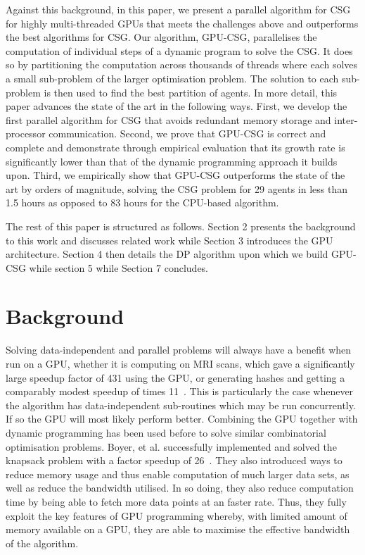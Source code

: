 \documentclass{llncs}
\begin{document}
Against this background, in this paper, we present a parallel algorithm for CSG for highly multi-threaded GPUs that meets the challenges above and outperforms the best algorithms for CSG. Our algorithm, GPU-CSG, parallelises the computation of individual steps of a dynamic program to solve the CSG. It does so by partitioning the computation across thousands of threads where each solves a small sub-problem of the larger optimisation problem. The solution to each sub-problem is then used to find the best partition of agents. In more detail, this paper advances the state of the art in the following ways. First, we develop the first parallel  algorithm for CSG that avoids redundant memory storage and inter-processor communication. Second, we prove that GPU-CSG is correct and complete and demonstrate through empirical evaluation that its growth rate is significantly lower than that of the dynamic programming approach it builds upon. Third, we empirically show that GPU-CSG outperforms the state of the art by orders of magnitude, solving the CSG problem for 29 agents in less than 1.5 hours as opposed to 83 hours for the CPU-based algorithm.

The rest of this paper is structured as follows. Section 2 presents the
background to this work and discusses related work while Section 3 introduces
the GPU architecture. Section 4 then details the DP algorithm upon which we build GPU-CSG
while section 5 while Section 7 concludes.

\section{Background}
Solving data-independent and parallel problems will always have a benefit when run on a GPU, 
whether it is computing on MRI scans, which gave a significantly large speedup factor of 431 using the GPU, or generating hashes and getting a comparably modest speedup of times 11~\cite{ryoo2008optimization}.  This is particularly the case whenever the algorithm has data-independent sub-routines which may be run concurrently. If so the GPU will most likely perform better. Combining the GPU together with dynamic programming has been used before to solve similar combinatorial optimisation problems.  Boyer, et al. successfully implemented and solved the knapsack problem with a factor speedup of 26~\cite{boyer2012solving}.  They also introduced ways to reduce memory usage and thus enable computation of much larger data sets, as well as reduce the  bandwidth utilised. In so doing, they also reduce computation time by being able to fetch more data points at an faster rate. Thus, they fully exploit the key features of GPU programming whereby, with limited amount of memory available on a GPU,  they are able to maximise the effective bandwidth of the algorithm.
\end{document}
